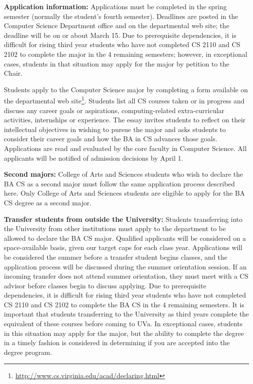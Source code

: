 \documentclass[10pt,letter,twocolumn]{book}
\newcommand{\myurl}[1]{\footnote{\scriptsize\url{#1}}}
\begin{document}
{\bf Application information:} Applications must be completed in the
spring semester (normally the student's fourth semester).  Deadlines
are posted in the Computer Science Department office and on the
departmental web site; the deadline will be on or about March 15.  Due
to prerequisite dependencies, it is difficult for rising third year
students who have not completed CS 2110 and CS 2102 to complete the
major in the 4 remaining semesters; however, in exceptional cases,
students in that situation may apply for the major by petition to the
Chair.

Students apply to the Computer Science major by completing a form
available on the departmental
web site\myurl{http://www.cs.virginia.edu/acad/declaring.html}. Students
list all CS courses taken or in progress and discuss any career goals
or aspirations, computing-related extra-curricular activities,
internships or experience. The essay invites students to reflect on
their intellectual objectives in wishing to pursue the major and asks
students to consider their career goals and how the BA in CS advances
those goals. Applications are read and evaluated by the core faculty
in Computer Science. All applicants will be notified of admission
decisions by April 1.

{\bf Second majors:} College of Arts and Sciences students who wish to
declare the BA CS as a second major must follow the same application
process described here. Only College of Arts and Sciences students are
eligible to apply for the BA CS degree as a second major.

{\bf Transfer students from outside the University:} Students
transferring into the University from other institutions must apply to
the department to be allowed to declare the BA CS major. Qualified
applicants will be considered on a space-available basis, given our
target caps for each class year. Applications will be considered the
summer before a transfer student begins classes, and the application
process will be discussed during the summer orientation session. If an
incoming transfer does not attend summer orientation, they must meet
with a CS advisor before classes begin to discuss applying.  Due to
prerequisite dependencies, it is difficult for rising third year
students who have not completed CS 2110 and CS 2102 to complete the
BA CS in the 4 remaining semesters. It is important that students
transferring to the University as third years complete the equivalent
of these courses before coming to UVa. In exceptional cases, students
in this situation may apply for the major, but the ability to complete
the degree in a timely fashion is considered in determining if
you are accepted into the degree program.
\end{document}
